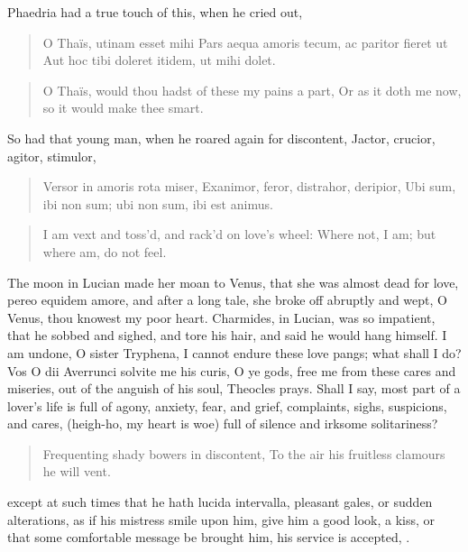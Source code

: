Phaedria had a true touch of this, when he cried out,

\begin{latin}
\begin{verse}
O Thaïs, utinam esset mihi
Pars aequa amoris tecum, ac paritor fieret ut
Aut hoc tibi doleret itidem, ut mihi dolet.
\end{verse}
\end{latin}
\translationrule%
\begin{verse}%
O Thaïs, would thou hadst of these my pains a part,
Or as it doth me now, so it would make thee smart.
\end{verse}%

So had that young man, when he roared again for discontent,
Jactor, crucior, agitor, stimulor,

\begin{latin}
\begin{verse}
Versor in amoris rota miser,
Exanimor, feror, distrahor, deripior,
Ubi sum, ibi non sum; ubi non sum, ibi est animus.
\end{verse}
\end{latin}
\translationrule%
\begin{verse}%
I am vext and toss'd, and rack'd on love's wheel:
Where not, I am; but where am, do not feel.
\end{verse}%

The moon in Lucian made her moan to Venus, that she was almost
dead for love, pereo equidem amore, and after a long tale, she broke
off abruptly and wept, O Venus, thou knowest my poor heart.
Charmides, in Lucian, was so impatient, that he sobbed and
sighed, and tore his hair, and said he would hang himself. I am undone,
O sister Tryphena, I cannot endure these love pangs; what shall I do?
Vos O dii Averrunci solvite me his curis, O ye gods, free me from these
cares and miseries, out of the anguish of his soul, Theocles
prays. Shall I say, most part of a lover's life is full of agony,
anxiety, fear, and grief, complaints, sighs, suspicions, and cares,
(heigh-ho, my heart is woe) full of silence and irksome solitariness?

\begin{verse}%
Frequenting shady bowers in discontent,
To the air his fruitless clamours he will vent.
\end{verse}%

except at such times that he hath lucida intervalla, pleasant gales, or
sudden alterations, as if his mistress smile upon him, give him a good
look, a kiss, or that some comfortable message be brought him, his
service is accepted, \etc{}.

